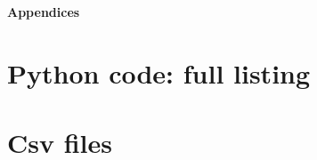 \clearpage
\appendix %
\renewcommand{\appendixpage}{\normalsize\textbf{Appendices}} %

\appendixpage %

\section{Python code: full listing}
\label{app:app-1}


\newpage
\section{Csv files}
\label{app:app-2}
